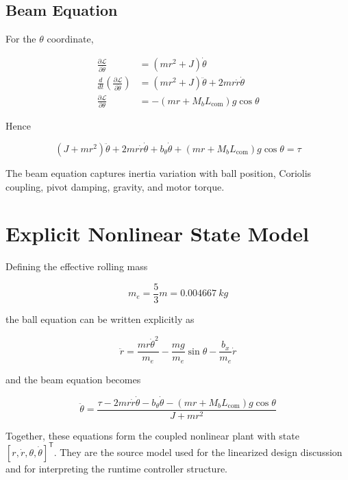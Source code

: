 \subsection{Beam Equation}

For the $\theta$ coordinate,

\begin{align}
  \frac{\partial \mathcal{L}}{\partial \dot{\theta}} &= (mr^2 + J)\dot{\theta} \\
  \frac{d}{dt}\left(\frac{\partial \mathcal{L}}{\partial \dot{\theta}}\right)
    &= (mr^2 + J)\ddot{\theta} + 2mr\dot{r}\dot{\theta} \\
  \frac{\partial \mathcal{L}}{\partial \theta}
    &= -(mr + M_bL_{\text{com}})g\cos\theta
\end{align}

Hence

\begin{equation}
  (J + mr^2)\ddot{\theta}
  + 2mr\dot{r}\dot{\theta}
  + b_{\theta}\dot{\theta}
  + (mr + M_bL_{\text{com}})g\cos\theta
  = \tau
  \label{eq:eom_theta}
\end{equation}

The beam equation captures inertia variation with ball position, Coriolis coupling,
pivot damping, gravity, and motor torque.

\section{Explicit Nonlinear State Model}

Defining the effective rolling mass

\begin{equation}
  m_e = \frac{5}{3}m = \SI{0.004667}{kg}
\end{equation}

the ball equation can be written explicitly as

\begin{equation}
  \ddot{r}
  = \frac{mr\dot{\theta}^2}{m_e}
  - \frac{mg}{m_e}\sin\theta
  - \frac{b_x}{m_e}\dot{r}
\end{equation}

and the beam equation becomes

\begin{equation}
  \ddot{\theta}
  =
  \frac{
    \tau
    - 2mr\dot{r}\dot{\theta}
    - b_{\theta}\dot{\theta}
    - (mr + M_bL_{\text{com}})g\cos\theta
  }{J + mr^2}
\end{equation}

Together, these equations form the coupled nonlinear plant with state
$[r,\dot{r},\theta,\dot{\theta}]^{\mathsf{T}}$. They are the source model used for the
linearized design discussion and for interpreting the runtime controller structure.
